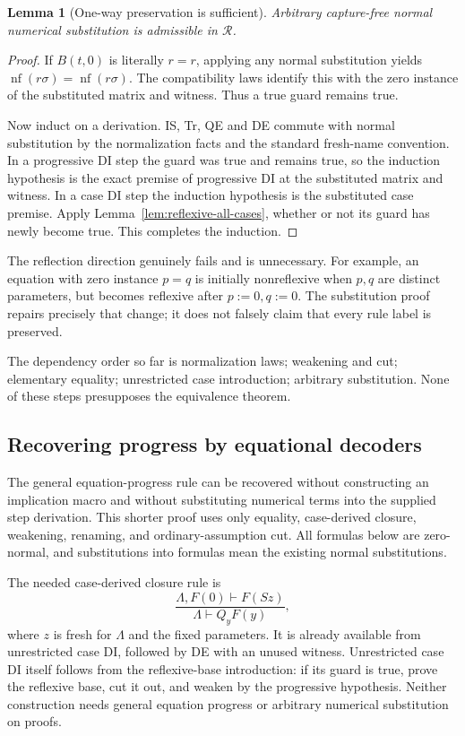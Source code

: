 \documentclass[11pt,a4paper]{article}
\newtheorem{lemma}[theorem]{Lemma}
\theoremstyle{definition}
\begin{document}
\begin{lemma}[One-way preservation is sufficient]
\label{lem:reflexive-substitution}
Arbitrary capture-free normal numerical substitution is admissible in
$\mathcal R$.
\end{lemma}
\begin{proof}
If $B(t,0)$ is literally $r=r$, applying any normal substitution yields
$\operatorname{nf}(r\sigma)=\operatorname{nf}(r\sigma)$.
The compatibility laws identify this with the zero instance of the
substituted matrix and witness.  Thus a true guard remains true.

Now induct on a derivation.  IS, Tr, QE and DE commute with normal
substitution by the normalization facts and the standard fresh-name
convention.  In a progressive DI step the guard was true and remains
true, so the induction hypothesis is the exact premise of progressive
DI at the substituted matrix and witness.  In a case DI step the
induction hypothesis is the substituted case premise.  Apply
Lemma~\ref{lem:reflexive-all-cases}, whether or not its guard has newly
become true.  This completes the induction.
\end{proof}

The reflection direction genuinely fails and is unnecessary.  For
example, an equation with zero instance $p=q$ is initially nonreflexive
when $p,q$ are distinct parameters, but becomes reflexive after
$p:=0,q:=0$.  The substitution proof repairs precisely that change;
it does not falsely claim that every rule label is preserved.

The dependency order so far is normalization laws; weakening and cut;
elementary equality; unrestricted case introduction; arbitrary
substitution.  None of these steps presupposes the equivalence theorem.

\subsection{Recovering progress by equational decoders}
\label{sec:equational-decoders}

The general equation-progress rule can be recovered without constructing
an implication macro and without substituting numerical terms into the
supplied step derivation.  This shorter proof uses only equality,
case-derived closure, weakening, renaming, and ordinary-assumption cut.
All formulas below are zero-normal, and substitutions into formulas mean
the existing normal substitutions.

The needed case-derived closure rule is
\begin{equation}
 \frac{\Lambda,F(0)\vdash F(Sz)}{\Lambda\vdash Q_yF(y)},
 \label{eq:decoder-qcase}
\end{equation}
where $z$ is fresh for $\Lambda$ and the fixed parameters.  It is already
available from unrestricted case DI, followed by DE with an unused
witness.  Unrestricted case DI itself follows from the reflexive-base
introduction: if its guard is true, prove the reflexive base, cut it out,
and weaken by the progressive hypothesis.  Neither construction needs
general equation progress or arbitrary numerical substitution on proofs.
\end{document}
